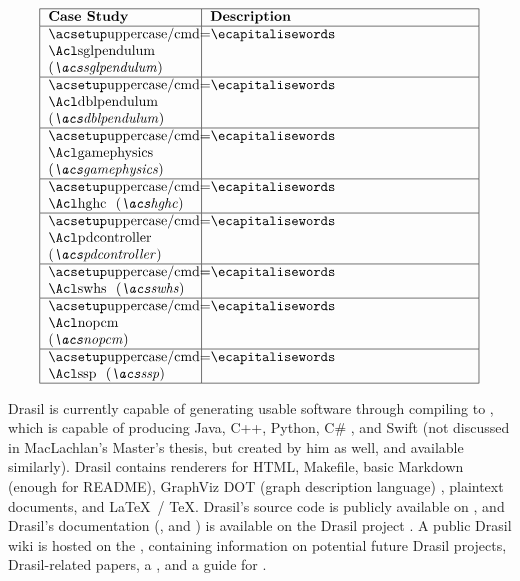 


\[\begin{tabular}{|>{\raggedright}p{0.3\textwidth}|>{\raggedright\arraybackslash}p{0.54\textwidth}|}
      \hline

      \textbf{Case Study} & \textbf{Description} \\ \hline

      \caseStudy{sglpendulum} & \\ \hline
      \caseStudy{dblpendulum} & \\ \hline
      \caseStudy{gamephysics} & \\ \hline
      \caseStudy{hghc} & \\ \hline
      \caseStudy{pdcontroller} & \\ \hline
      \caseStudy{swhs} & \\ \hline
      \caseStudy{nopcm} & \\ \hline
      \caseStudy{ssp} & \\

      \hline
\end{tabular}\]

Drasil is currently capable of generating usable software through compiling to
, which is capable of producing Java, C++, Python, C\#
\cite{MacLachlan2020}, and Swift (not discussed in MacLachlan's Master's thesis,
but created by him as well, and available similarly). Drasil contains renderers
for HTML, Makefile, basic Markdown (enough for README), GraphViz DOT (graph
description language) \cite{Gansner1993}, plaintext documents, and \LaTeX\ /
\TeX. Drasil's source code is publicly available on
, and Drasil's
documentation
(,
and
)
is available on the Drasil project
. A public Drasil
wiki is hosted on the , containing information
on potential future Drasil projects, Drasil-related papers, a
, and a
guide for .

